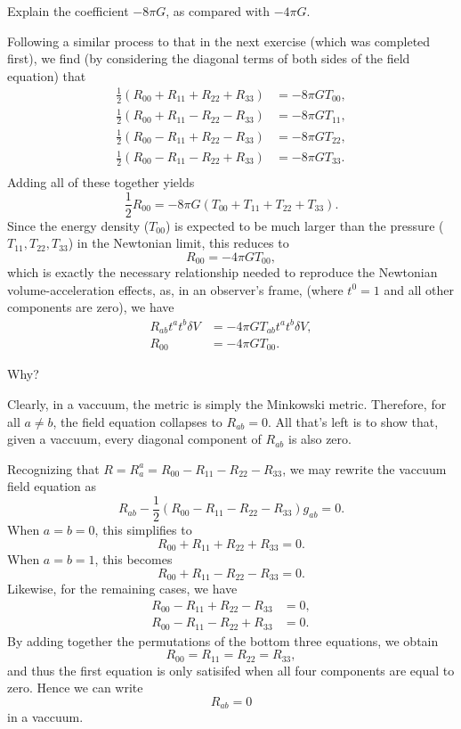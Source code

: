 \documentclass[../road-to-reality.tex]{subfiles}
\begin{document}
\begin{questions}
\question Explain the coefficient $-8\pi{G}$, as compared with $-4\pi{G}$.

\begin{solution}
  Following a similar process to that in the next exercise (which was completed
  first), we find (by considering the diagonal terms of both sides of the field
  equation) that
  \begin{align*}
    \frac{1}{2}(R_{00} + R_{11} + R_{22} + R_{33}) &= -8\pi{G}T_{00}, \\
\frac{1}{2}(R_{00} + R_{11} - R_{22} - R_{33}) &= -8\pi{G}T_{11}, \\
\frac{1}{2}(R_{00} - R_{11} + R_{22} - R_{33}) &= -8\pi{G}T_{22}, \\
\frac{1}{2}(R_{00} - R_{11} - R_{22} + R_{33}) &= -8\pi{G}T_{33}. \\
  \end{align*}
  Adding all of these together yields
  \[
    \frac{1}{2}R_{00} = -8\pi{G}(T_{00} + T_{11} + T_{22} + T_{33}).
  \]
  Since the energy density ($T_{00}$) is expected to be much larger than the
  pressure ($T_{11}, T_{22}, T_{33}$) in the Newtonian limit, this reduces to
  \[
    R_{00} = -4\pi{G}T_{00},
  \]
  which is exactly the necessary relationship needed to reproduce the Newtonian
  volume-acceleration effects, as, in an observer's frame, (where $t^0 = 1$ and
  all other components are zero), we have
  \begin{align*}
    R_{ab}t^{a}t^{b}\delta{V} &= -4\pi{G}T_{ab}t^at^b\delta{V}, \\
    R_{00} &= -4\pi{G}T_{00}.
    \end{align*}
\end{solution}

\question Why?

  \begin{solution}
    Clearly, in a vaccuum, the metric is simply the Minkowski metric. Therefore,
    for all $a\neq{b}$, the field equation collapses to $R_{ab}=0$. All that's
    left is to show that, given a vaccuum, every diagonal component of $R_{ab}$
    is also zero.

    Recognizing that $R=R_a^a=R_{00}-R_{11}-R_{22}-R_{33}$, we may rewrite the
    vaccuum field equation as
    \[
      R_{ab} - \frac{1}{2}(R_{00}-R_{11}-R_{22}-R_{33})g_{ab} = 0.
    \]
    When $a=b=0$, this simplifies to
    \[
      R_{00} + R_{11} + R_{22} + R_{33} = 0.
    \]
    When $a=b=1$, this becomes
    \[
      R_{00} + R_{11} - R_{22} - R_{33} = 0.
    \]
    Likewise, for the remaining cases, we have
    \begin{align*}
      R_{00} - R_{11} + R_{22} - R_{33} &= 0, \\
      R_{00} - R_{11} - R_{22} + R_{33} &= 0.
    \end{align*}
    By adding together the permutations of the bottom three equations, we obtain
    \[
      R_{00} = R_{11} = R_{22} = R_{33},
    \]
    and thus the first equation is only satisifed when all four components are
    equal to zero. Hence we can write
    \[
      R_{ab}=0
    \]
    in a vaccuum.
  \end{solution}


\end{questions}
\end{document}
